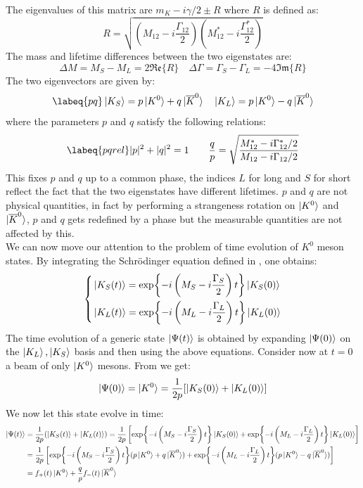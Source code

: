 \documentclass[../main.tex]{subfiles}
\begin{document}
The eigenvalues of this matrix are $m_K-i\gamma/2\pm R$ where $R$ is defined as:
\[
R=\sqrt{\left(M_{12}-i\frac{\Gamma_{12}}{2}\right)\left(M_{12}^*-i\frac{\Gamma_{12}^*}{2}\right)}
\]
The mass and lifetime differences between the two eigenstates are:
\[
\Delta M=M_S-M_L=2\mathfrak{Re}\{R\} \quad \Delta\Gamma=\Gamma_S-\Gamma_L=-4\mathfrak{Im}\{R\}
\]
The two eigenvectors are given by:
\begin{equation}
\labeq{pq}
\ket{K_S}=p\ket{K^0}+q\ket{\overline{K}^0} \quad \ket{K_L}=p\ket{K^0}-q\ket{\overline{K}^0}
\end{equation}
where the parameters $p$ and $q$ satisfy the following relations:
\begin{equation}
\labeq{pqrel}
|p|^2+|q|^2=1 \qquad \frac{q}{p}=\sqrt{\frac{M_{12}^*-i\Gamma_{12}^*/2}{M_{12}-i\Gamma_{12}/2}}
\end{equation}
This fixes $p$ and $q$ up to a common phase, the indices $L$ for long and $S$ for short reflect the fact that the two eigenstates have different lifetimes. $p$ and $q$ are not physical quantities, in fact by performing a strangeness rotation on $\ket{K^0}$ and $\ket{\overline{K}^0}$, $p$ and $q$ gets redefined by a phase but the measurable quantities are not affected by this.\\
We can now move our attention to the problem of time evolution of $K^0$ meson states. By integrating the Schr\"odinger equation defined in , one obtains:
\[
\left\{
\begin{aligned}
&\ket{K_S(t)}=\exp{-i\left(M_S-i\frac{\Gamma_S}{2}\right)t}\ket{K_S(0)}\\
&\ket{K_L(t)}=\exp{-i\left(M_L-i\frac{\Gamma_L}{2}\right)t}\ket{K_L(0)}
\end{aligned}
\right.
\]
The time evolution of a generic state $\ket{\Psi(t)}$ is obtained by expanding $\ket{\Psi(0)}$ on the $\ket{K_L}, \ket{K_S}$ basis and then using the above equations. Consider now at $t=0$ a beam of only $\ket{K^0}$ mesons. From  we get:
\[
\ket{\Psi(0)}=\ket{K^0}=\frac{1}{2p}[\ket{K_S(0)}+\ket{K_L(0)}]
\]
We now let this state evolve in time:
\begin{align*}
\ket{\Psi(t)}&=\frac{1}{2p}(\ket{K_S(t)}+\ket{K_L(t)})=\frac{1}{2p}\left[\exp{-i\left(M_S-i\frac{\Gamma_S}{2}\right)t}\ket{K_S(0)}+\exp{-i\left(M_L-i\frac{\Gamma_L}{2}\right)t}\ket{K_L(0)}\right]\\
&=\frac{1}{2p}\left[\exp{-i\left(M_S-i\frac{\Gamma_S}{2}\right)t}(p\ket{K^0}+q\ket{\overline{K}^0})+\exp{-i\left(M_L-i\frac{\Gamma_L}{2}\right)t}(p\ket{K^0}-q\ket{\overline{K}^0})\right]\\
&=f_+(t)\ket{K^0}+\frac{q}{p}f_-(t)\ket{\overline{K}^0}
\end{align*}
\end{document}
